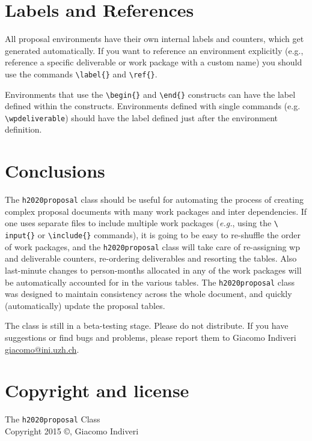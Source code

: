 \documentclass[pdftext]{article}
\begin{document}
\section{Labels and References}
\label{sec:labels-references}

All proposal environments have their own internal labels and counters,
which get generated automatically. If you want to reference an
environment explicitly (e.g., reference a specific deliverable or work
package with a custom name) you should use the commands
\texttt{\textbackslash label\{\}} and \texttt{\textbackslash ref\{\}}.

Environments that use the \texttt{\textbackslash begin\{\}} and
\texttt{\textbackslash end\{\}} constructs can have the label defined
within the constructs. Environments defined with single commands
(e.g. \texttt{\textbackslash wpdeliverable}) should have the label
defined just after the environment definition.

\section{Conclusions}
\label{sec:conclusions}

The \texttt{h2020proposal} class should be useful for automating the
process of creating complex proposal documents with many work packages
and inter dependencies. If one uses separate files to include multiple
work packages (\emph{e.g.}, using the \texttt{\textbackslash
  input\{\}} or \texttt{\textbackslash include\{\}} commands), it is
going to be easy to re-shuffle the order of work packages, and the
\texttt{h2020proposal} class will take care of re-assigning wp and
deliverable counters, re-ordering deliverables and resorting the
tables. Also last-minute changes to person-months allocated in any of
the work packages will be automatically accounted for in the various
tables. The \texttt{h2020proposal} class was designed to maintain
consistency across the whole document, and quickly (automatically)
update the proposal tables.

The class is still in a beta-testing stage. Please do not
distribute. If you have suggestions or find bugs and problems, please
report them to Giacomo Indiveri \url{giacomo@ini.uzh.ch}.

\section*{Copyright and license}
The \texttt{h2020proposal} Class\\
Copyright 2015 \copyright, Giacomo Indiveri 
\end{document}
